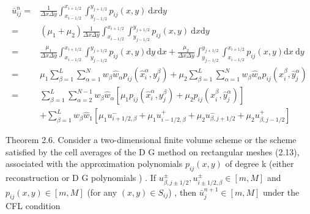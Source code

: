 \documentclass{book}
\begin{document}
\begin{equation}
    \begin{aligned}
        \bar{u}_{i j}^{n}  = & \frac{1}{\Delta x \Delta y}\int_{x_{i-1 / 2}}^{x_{i+1 / 2}} \int_{y_{j-1 / 2}}^{y_{j+1 / 2}} p_{i j}(x, y) \mathrm{~d} x\mathrm{d} y                                                                                                                                                      \\
        =                    & (\mu_1+\mu_2)   \frac{1}{\Delta x \Delta y}\int_{x_{i-1 / 2}}^{x_{i+1 / 2}} \int_{y_{j-1 / 2}}^{y_{j+1 / 2}} p_{i j}(x, y) \mathrm{~d} x\mathrm{d} y                                                                                                                                      \\
        =                    & \frac{\mu_{1}}{\Delta x \Delta y} \int_{x_{i-1 / 2}}^{x_{i+1 / 2}} \int_{y_{j-1 / 2}}^{y_{j+1 / 2}} p_{i j}(x, y) \mathrm{d} y \mathrm{~d} x+\frac{\mu_{2}}{\Delta x \Delta y} \int_{y_{j-1 / 2}}^{y_{j+1 / 2}} \int_{x_{i-1 / 2}}^{x_{i+1 / 2}} p_{i j}(x, y) \mathrm{d} x \mathrm{~d} y \\
        =                    & \mu_{1} \sum_{\beta=1}^{L} \sum_{\alpha=1}^{N} w_{\beta} \hat{w}_{\alpha} p_{i j}\left(\hat{x}_{i}^{\alpha}, y_{j}^{\beta}\right)+\mu_{2} \sum_{\beta=1}^{L} \sum_{\alpha=1}^{N} w_{\beta} \hat{w}_{\alpha} p_{i j}\left(x_{i}^{\beta}, \hat{y}_{j}^{\alpha}\right)                       \\
        =                    & \sum_{\beta=1}^{L} \sum_{\alpha=2}^{N-1} w_{\beta} \hat{w}_{\alpha}\left[\mu_{1} p_{i j}\left(\hat{x}_{i}^{\alpha}, y_{j}^{\beta}\right)+\mu_{2} p_{i j}\left(x_{i}^{\beta}, \hat{y}_{j}^{\alpha}\right)\right]                                                                           \\
                             & +\sum_{\beta=1}^{L} w_{\beta} \hat{w}_{1}\left[\mu_{1} u_{i+1 / 2, \beta}^{-}+\mu_{1} u_{i-1 / 2, \beta}^{+}+\mu_{2} u_{\beta, j+1 / 2}^{-}+\mu_{2} u_{\beta, j-1 / 2}^{+}\right]
    \end{aligned}
\end{equation}

Theorem 2.6. Consider a two-dimensional finite volume scheme or the scheme satisfied by the cell averages of the  D G  method on rectangular meshes (2.13), associated with the approximation polynomials  $p_{i j}(x, y)$  of degree  k  (either reconstruction or  D G  polynomials  ) . If  $u_{\beta, j \pm 1 / 2}^{ \pm}, u_{i \pm 1 / 2, \beta}^{ \pm} \in[m, M]$  and  $p_{i j}(x, y) \in   [m, M]$  (for any  $(x, y) \in S_{i j}$) , then  $\bar{u}_{j}^{n+1} \in[m, M]$  under the  CFL  condition
\end{document}
